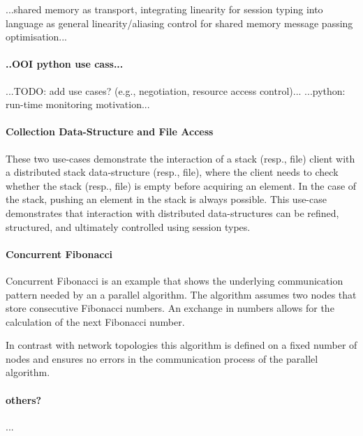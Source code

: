 ...shared memory as transport, integrating linearity for session typing into language as general linearity/aliasing control for shared memory message passing optimisation...


\paragraph{..OOI python use cass...}

...TODO: add use cases? (e.g., negotiation, resource access control)... ...python: run-time monitoring motivation...


\paragraph{Collection Data-Structure and File Access}

These two use-cases demonstrate the interaction
of a stack (resp., file) client with a distributed
stack data-structure (resp., file),
where the client needs to check whether the stack (resp., file)
is empty before acquiring an element.
In the case of the stack, pushing an element in the
stack is always possible.
This use-case demonstrates that interaction with
distributed data-structures can be refined,
structured, and ultimately controlled
using session types.

\paragraph{Concurrent Fibonacci}

Concurrent Fibonacci is an example that shows the
underlying communication pattern needed by an
a parallel algorithm. The algorithm assumes
two nodes that store consecutive Fibonacci
numbers. An exchange in numbers allows for
the calculation of the next Fibonacci number.

In contrast with network topologies this algorithm
is defined on a fixed number of nodes and ensures
no errors in the communication process of the parallel
algorithm.


\paragraph{others?}

...

